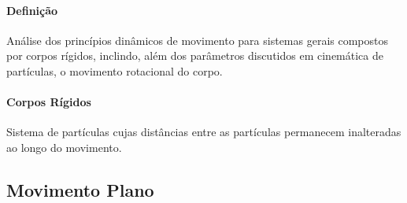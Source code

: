\documentclass{article}
\begin{document}
        \paragraph{Definição}Análise dos princípios dinâmicos de movimento para sistemas gerais compostos por corpos rígidos, inclindo, além dos parâmetros discutidos em cinemática de partículas, o movimento rotacional do corpo.

        \paragraph{Corpos Rígidos}Sistema de partículas cujas distâncias entre as partículas permanecem inalteradas ao longo do movimento.

        \subsection{Movimento Plano}
\end{document}
